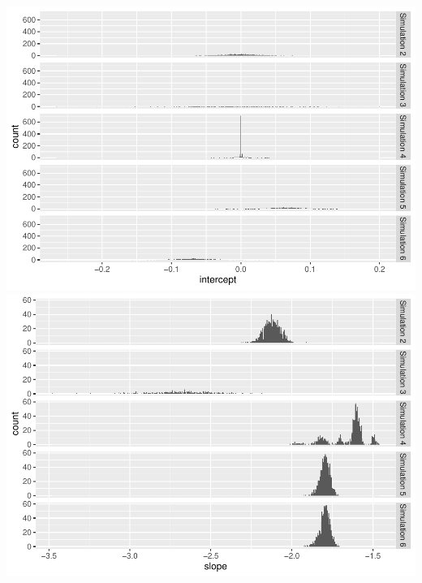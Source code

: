 \documentclass[
  man]{apa6}
\begin{document}
\includegraphics{ICC_project_files/figure-latex/unnamed-chunk-1-1.pdf} \includegraphics{ICC_project_files/figure-latex/unnamed-chunk-1-2.pdf}
\end{document}
